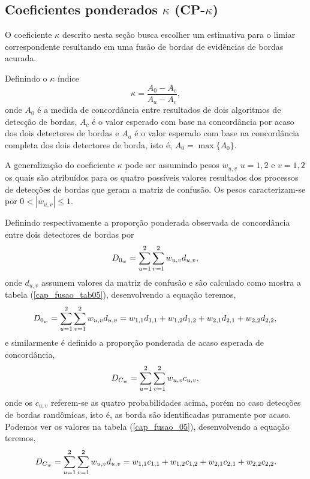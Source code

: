 \subsection{Coeficientes ponderados $\kappa$ (CP-$\kappa$)}
O coeficiente $\kappa$ descrito nesta seção busca escolher um estimativa para o limiar correspondente resultando em uma fusão de bordas de evidências de bordas acurada.

Definindo o $\kappa$ índice
$$\kappa = \frac{A_0 - A_c}{A_a - A_c},$$
onde $A_0$ é a medida de concordância entre resultados de dois algoritmos de detecção de bordas, $A_c$ é o valor esperado com base na concordância por acaso dos dois detectores de bordas e $A_a$ é o valor esperado com base na concordância completa dos dois detectores de borda, isto é, $A_0=\max\{A_0\}$.

A generalização do coeficiente $\kappa$ pode ser assumindo pesos $w_{u,v}$ $u=1,2$ e $v=1,2$ os quais são atribuídos para os quatro possíveis valores resultados dos processos de detecções de bordas que geram a matriz de confusão. Os pesos caracterizam-se por $0<|w_{u,v}|\le 1$. 

Definindo respectivamente a proporção ponderada observada de concordância entre dois detectores de bordas por 
\begin{equation}\label{cap_fusao_40}
	D_{0_w} =\sum_{u=1}^{2}\sum_{v=1}^{2} w_{u,v}d_{u,v},  \\
\end{equation}
onde $d_{u,v}$ assumem valores da matriz de confusão e são calculado como mostra a tabela (\ref{cap_fusao_tab05}), desenvolvendo a equação teremos,
\begin{equation}\label{cap_fusao_41}
	D_{0_w} =\sum_{u=1}^{2}\sum_{v=1}^{2} w_{u,v}d_{u,v}= w_{1,1}d_{1,1}+w_{1,2}d_{1,2}+w_{2,1}d_{2,1}+w_{2,2}d_{2,2},  \\
\end{equation}
e similarmente é definido a proporção ponderada de acaso esperada de concordância,
\begin{equation}\label{cap_fusao_42}
	D_{C_w} =\sum_{u=1}^{2}\sum_{v=1}^{2} w_{u,v}c_{u,v},  \\
\end{equation}
onde os $c_{u,v}$ referem-se as quatro probabilidades acima, porém no caso detecções de bordas randômicas, isto é, as borda são identificadas puramente por acaso. Podemos ver os valores na tabela (\ref{cap_fusao_05}), desenvolvendo a equação teremos,  
\begin{equation}\label{cap_fusao_43}
	D_{C_w} =\sum_{u=1}^{2}\sum_{v=1}^{2} w_{u,v}d_{u,v}= w_{1,1}c_{1,1}+w_{1,2}c_{1,2}+w_{2,1}c_{2,1}+w_{2,2}c_{2,2}.  \\
\end{equation}

